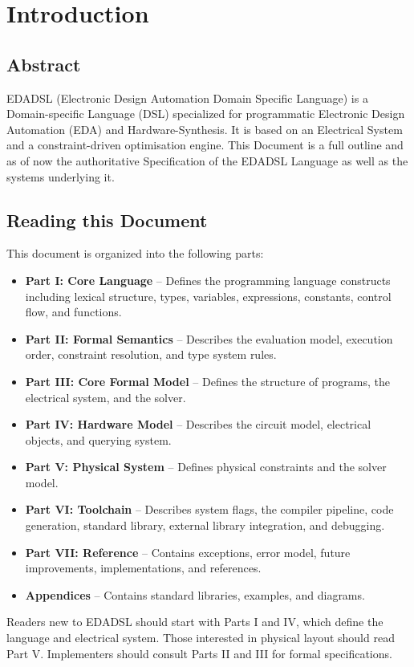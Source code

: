 \chapter{Introduction}
\section{Abstract}
EDADSL (Electronic Design Automation Domain Specific Language) is a Domain-specific Language (DSL) specialized for programmatic Electronic Design Automation (EDA) and Hardware-Synthesis. 
It is based on an Electrical System and a constraint-driven optimisation engine.
This Document is a full outline and as of now the authoritative Specification of the EDADSL Language as well as the systems underlying it.

\section{Reading this Document}
This document is organized into the following parts:

\begin{itemize}
\item \textbf{Part I: Core Language} -- Defines the programming language constructs including lexical structure, types, variables, expressions, constants, control flow, and functions.
\item \textbf{Part II: Formal Semantics} -- Describes the evaluation model, execution order, constraint resolution, and type system rules.
\item \textbf{Part III: Core Formal Model} -- Defines the structure of programs, the electrical system, and the solver.
\item \textbf{Part IV: Hardware Model} -- Describes the circuit model, electrical objects, and querying system.
\item \textbf{Part V: Physical System} -- Defines physical constraints and the solver model.
\item \textbf{Part VI: Toolchain} -- Describes system flags, the compiler pipeline, code generation, standard library, external library integration, and debugging.
\item \textbf{Part VII: Reference} -- Contains exceptions, error model, future improvements, implementations, and references.
\item \textbf{Appendices} -- Contains standard libraries, examples, and diagrams.
\end{itemize}

Readers new to EDADSL should start with Parts I and IV, which define the language and electrical system. Those interested in physical layout should read Part V. Implementers should consult Parts II and III for formal specifications.


